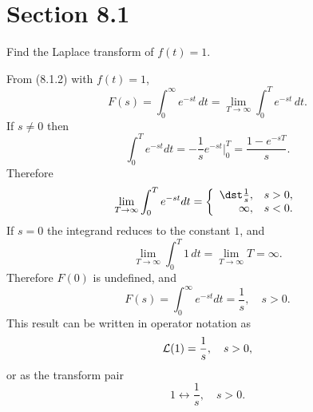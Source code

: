 \section*{Section 8.1}
{}
\setcounter{chapter}{8}
\setcounter{section}{1}

\setcounter{example}{0}
\begin{example}
  \label{example:8.1.1}\rm Find the Laplace transform of $f(t)=1$.
\end{example}
\setcounter{equation}{2}
\begin{examplesolution}
\solution From \textup{(8.1.2)} with $f(t)=1$,
\[
  F(s)=\int_{0}^{\infty}e^{-st}\,dt=\lim_{T\to\infty}\int_{0}^{T}e^{-st}\, dt.
\]
If $s\ne0$ then
\begin{equation}
  \label{eq:8.1.3}\int_{0}^{T}e^{-st}dt=-\frac{1}{s}e^{-st}\Big|_{0}^{T}=\frac{1-e^{-sT}}{s}.
\end{equation}
Therefore
\begin{equation}
  \label{eq:8.1.4}\lim_{T\to\infty}\int_{0}^{T}e^{-st}dt=\left\{
  \begin{array}{rr}
    \dst\frac{1}{s}, & s>0, \\
    \infty,          & s<0.
  \end{array}\right.
\end{equation}
If $s=0$ the integrand reduces to the constant $1$, and
\[
  \lim_{T\to\infty}\int_{0}^{T}1\,dt= \lim_{T\to\infty}T=\infty.
\]
Therefore $F(0)$ is undefined, and
\[
  F(s)=\int_{0}^{\infty}e^{-st}dt=\frac{1}{s},\quad s>0.
\]
This result can be written in operator notation as
\[
  {\cal L}(1)=\frac{1}{s},\quad s>0,
\]
or as the transform pair
\[
  1\leftrightarrow\frac{1}{s},\quad s>0.
\]

\relax
{}
\color{black}
\end{examplesolution}

